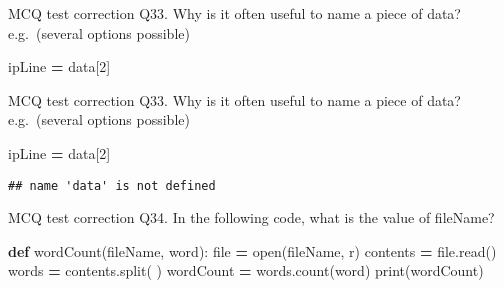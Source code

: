 \documentclass[
  8pt,
  ignorenonframetext,
]{beamer}
\newenvironment{Shaded}{\begin{snugshade}}{\end{snugshade}}
\newcommand{\BuiltInTok}[1]{#1}
\newcommand{\DecValTok}[1]{\textcolor[rgb]{0.00,0.00,0.81}{#1}}
\newcommand{\KeywordTok}[1]{\textcolor[rgb]{0.13,0.29,0.53}{\textbf{#1}}}
\newcommand{\NormalTok}[1]{#1}
\newcommand{\OperatorTok}[1]{\textcolor[rgb]{0.81,0.36,0.00}{\textbf{#1}}}
\newcommand{\StringTok}[1]{\textcolor[rgb]{0.31,0.60,0.02}{#1}}
\begin{document}
\begin{frame}[fragile]{MCQ test correction}
\protect\hypertarget{mcq-test-correction-64}{}
Q33. Why is it often useful to name a piece of data? e.g.~(several
options possible)

\begin{Shaded}
\begin{Highlighting}[]
\NormalTok{ipLine }\OperatorTok{=}\NormalTok{ data[}\DecValTok{2}\NormalTok{]}
\end{Highlighting}
\end{Shaded}
\end{frame}

\begin{frame}[fragile]{MCQ test correction}
\protect\hypertarget{mcq-test-correction-65}{}
Q33. Why is it often useful to name a piece of data? e.g.~(several
options possible)

\begin{Shaded}
\begin{Highlighting}[]
\NormalTok{ipLine }\OperatorTok{=}\NormalTok{ data[}\DecValTok{2}\NormalTok{]}
\end{Highlighting}
\end{Shaded}

\begin{verbatim}
## name 'data' is not defined
\end{verbatim}
\end{frame}

\begin{frame}[fragile]{MCQ test correction}
\protect\hypertarget{mcq-test-correction-66}{}
Q34. In the following code, what is the value of fileName?

\begin{Shaded}
\begin{Highlighting}[]
\KeywordTok{def}\NormalTok{ wordCount(fileName, word):}
    \BuiltInTok{file}  \OperatorTok{=} \BuiltInTok{open}\NormalTok{(fileName, }\StringTok{\textquotesingle{}r\textquotesingle{}}\NormalTok{)}
\NormalTok{    contents }\OperatorTok{=} \BuiltInTok{file}\NormalTok{.read()}
\NormalTok{    words }\OperatorTok{=}\NormalTok{ contents.split(}\StringTok{\textquotesingle{} \textquotesingle{}}\NormalTok{)}
\NormalTok{        wordCount }\OperatorTok{=}\NormalTok{ words.count(word)}
        \BuiltInTok{print}\NormalTok{(wordCount)}
\end{Highlighting}
\end{Shaded}
\end{frame}
\end{document}
